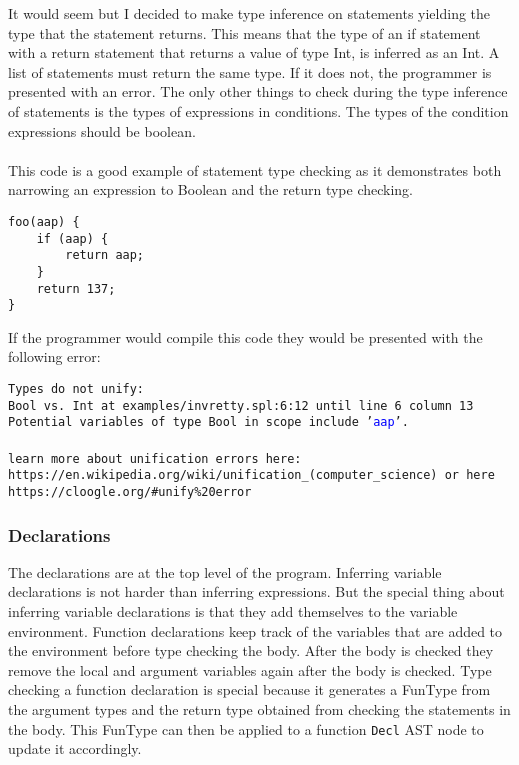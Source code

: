 \documentclass{report}
\begin{document}
It would seem but I decided to make type inference on statements yielding the type that the statement returns. This means that the type of an if statement with a return statement that returns a value of type Int, is inferred as an Int. A list of statements must return the same type. If it does not, the programmer is presented with an error. The only other things to check during the type inference of statements is the types of expressions in conditions. The types of the condition expressions should be boolean. 
\\\\
This code is a good example of statement type checking as it demonstrates both narrowing an expression to Boolean and the return type checking.  

\begin{lstlisting}[style=SPL]
foo(aap) {
    if (aap) {
        return aap;
    }
    return 137;
}
\end{lstlisting}

\noindent If the programmer would compile this code they would be presented with the following error:

\noindent\texttt{Types do not unify:\\
\textcolor{type}{Bool} vs. \textcolor{type}{Int} at \textcolor{filename}{examples/invretty.spl:6:12} until line 6 column 13\\
Potential variables of type \textcolor{type}{Bool} in scope include '\textcolor{blue}{aap}'.\\
\\
learn more about unification errors here:\\ https://en.wikipedia.org/wiki/unification\_(computer\_science) or here https://cloogle.org/#unify\%20error}

\subsubsection{Declarations}

The declarations are at the top level of the program. 
Inferring variable declarations is not harder than inferring expressions. But the special thing about inferring variable declarations is that they add themselves to the variable environment.
Function declarations keep track of the variables that are added to the environment before type checking the body. After the body is checked they remove the local and argument variables again after the body is checked. Type checking a function declaration is special because it generates a FunType from the argument types and the return type obtained from checking the statements in the body. This FunType can then be applied to a function \texttt{Decl} AST node to update it accordingly.
\end{document}
